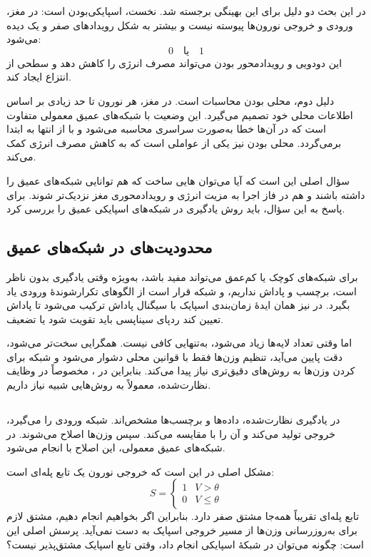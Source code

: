 در این بحث دو دلیل برای این بهینگی برجسته شد. نخست، اسپایکی‌بودن است: در مغز، ورودی و خروجی نورون‌ها پیوسته نیست و بیشتر به شکل رویدادهای صفر و یک دیده می‌شود:
\[
0 \quad \text{یا} \quad 1
\]
این دودویی و رویدادمحور بودن می‌تواند مصرف انرژی را کاهش دهد و سطحی از انتزاع ایجاد کند.

دلیل دوم، محلی بودن محاسبات است. در مغز، هر نورون تا حد زیادی بر اساس اطلاعات محلی خود تصمیم می‌گیرد. این وضعیت با شبکه‌های عمیق معمولی متفاوت است که در آن‌ها خطا به‌صورت سراسری محاسبه می‌شود و با  از انتها به ابتدا برمی‌گردد. محلی بودن نیز یکی از عواملی است که به کاهش مصرف انرژی کمک می‌کند.

سؤال اصلی این است که آیا می‌توان هایی ساخت که هم توانایی شبکه‌های عمیق را داشته باشند و هم در فاز اجرا به مزیت انرژی و رویدادمحوری مغز نزدیک‌تر شوند. برای پاسخ به این سؤال، باید روش یادگیری در شبکه‌های اسپایکی عمیق را بررسی کرد.

\subsection{محدودیت‌های  در شبکه‌های عمیق}
 برای شبکه‌های کوچک یا کم‌عمق می‌تواند مفید باشد، به‌ویژه وقتی یادگیری بدون ناظر است، برچسب و پاداش نداریم، و شبکه قرار است از الگوهای تکرارشوندهٔ ورودی یاد بگیرد. در  نیز همان ایدهٔ زمان‌بندی اسپایک با سیگنال پاداش ترکیب می‌شود تا پاداش تعیین کند ردپای سیناپسی باید تقویت شود یا تضعیف.

اما وقتی تعداد لایه‌ها زیاد می‌شود،  به‌تنهایی کافی نیست. همگرایی سخت‌تر می‌شود، دقت پایین می‌آید، تنظیم وزن‌ها فقط با قوانین محلی دشوار می‌شود و شبکه برای  کردن وزن‌ها به روش‌های دقیق‌تری نیاز پیدا می‌کند. بنابراین در ، مخصوصاً در وظایف نظارت‌شده، معمولاً به روش‌هایی شبیه  نیاز داریم.

\subsection{}
در یادگیری نظارت‌شده، داده‌ها و برچسب‌ها مشخص‌اند. شبکه ورودی را می‌گیرد، خروجی تولید می‌کند و آن را با  مقایسه می‌کند. سپس وزن‌ها اصلاح می‌شوند. در شبکه‌های عمیق معمولی، این اصلاح با  انجام می‌شود.

مشکل اصلی در  این است که خروجی نورون یک تابع پله‌ای است:
\[
S =
\begin{cases}
1 & V > \theta \\
0 & V \leq \theta
\end{cases}
\]
تابع پله‌ای تقریباً همه‌جا مشتق صفر دارد. بنابراین اگر بخواهیم  انجام دهیم، مشتق لازم برای به‌روزرسانی وزن‌ها از مسیر خروجی اسپایک به دست نمی‌آید. پرسش اصلی این است: چگونه می‌توان در شبکهٔ اسپایکی  انجام داد، وقتی تابع اسپایک مشتق‌پذیر نیست؟

